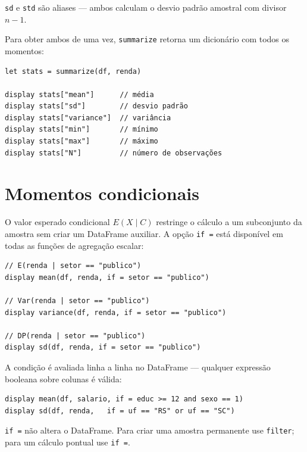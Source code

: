 \begin{nota}
  \lstinline{sd} e \lstinline{std} são aliases — ambos calculam o desvio padrão
  amostral com divisor $n-1$.
\end{nota}

Para obter ambos de uma vez, \lstinline{summarize} retorna um dicionário com
todos os momentos:

\begin{lstlisting}
let stats = summarize(df, renda)

display stats["mean"]      // média
display stats["sd"]        // desvio padrão
display stats["variance"]  // variância
display stats["min"]       // mínimo
display stats["max"]       // máximo
display stats["N"]         // número de observações
\end{lstlisting}

\section{Momentos condicionais}

O valor esperado condicional $E(X \mid C)$ restringe o cálculo a um subconjunto
da amostra sem criar um DataFrame auxiliar. A opção \lstinline{if =} está
disponível em todas as funções de agregação escalar:

\begin{lstlisting}[caption={Momentos condicionais com if =}]
// E(renda | setor == "publico")
display mean(df, renda, if = setor == "publico")

// Var(renda | setor == "publico")
display variance(df, renda, if = setor == "publico")

// DP(renda | setor == "publico")
display sd(df, renda, if = setor == "publico")
\end{lstlisting}

A condição é avaliada linha a linha no DataFrame — qualquer expressão booleana
sobre colunas é válida:

\begin{lstlisting}[caption={Condições compostas}]
display mean(df, salario, if = educ >= 12 and sexo == 1)
display sd(df, renda,   if = uf == "RS" or uf == "SC")
\end{lstlisting}

\begin{dica}
  \lstinline{if =} não altera o DataFrame. Para criar uma amostra permanente
  use \lstinline{filter}; para um cálculo pontual use \lstinline{if =}.
\end{dica}

